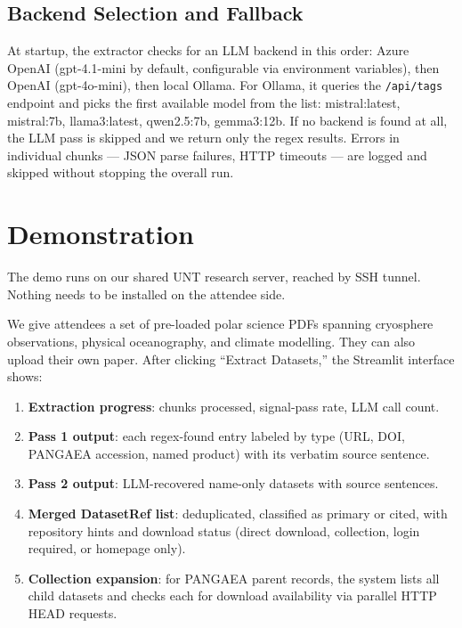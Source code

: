 \documentclass[sigconf]{acmart}
\begin{document}
\subsection{Backend Selection and Fallback}

At startup, the extractor checks for an LLM backend in this order: Azure OpenAI
(gpt-4.1-mini by default, configurable via environment variables), then
OpenAI (gpt-4o-mini), then local Ollama. For Ollama, it queries the
\texttt{/api/tags} endpoint and picks the first available model from the list:
mistral:latest, mistral:7b, llama3:latest, qwen2.5:7b, gemma3:12b. If no backend
is found at all, the LLM pass is skipped and we return only the regex results.
Errors in individual chunks — JSON parse failures, HTTP timeouts — are logged and
skipped without stopping the overall run.

\section{Demonstration}

The demo runs on our shared UNT research server, reached by SSH tunnel. Nothing
needs to be installed on the attendee side.

We give attendees a set of pre-loaded polar science PDFs spanning cryosphere
observations, physical oceanography, and climate modelling. They can also upload
their own paper. After clicking ``Extract Datasets,'' the Streamlit interface shows:

\begin{enumerate}[noitemsep, topsep=2pt]
  \item \textbf{Extraction progress}: chunks processed, signal-pass rate, LLM call
    count.
  \item \textbf{Pass 1 output}: each regex-found entry labeled by type (URL, DOI,
    PANGAEA accession, named product) with its verbatim source sentence.
  \item \textbf{Pass 2 output}: LLM-recovered name-only datasets with source
    sentences.
  \item \textbf{Merged DatasetRef list}: deduplicated, classified as primary or
    cited, with repository hints and download status (direct download, collection,
    login required, or homepage only).
  \item \textbf{Collection expansion}: for PANGAEA parent records, the system lists
    all child datasets and checks each for download availability via parallel HTTP
    HEAD requests.
\end{enumerate}
\end{document}
